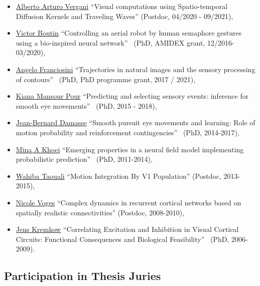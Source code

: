\documentclass[10pt,english,a4paper,oneside]{article}%
\begin{document}
\begin{itemize}
	\item \href{https://laurentperrinet.github.io/author/alberto-arturo-vergani/}{Alberto Arturo Vergani} 	``Visual computations using Spatio-temporal Diffusion Kernels and Traveling Waves'' (Postdoc, 04/2020 - 09/2021),
	\item \href{https://laurentperrinet.github.io/author/victor-boutin/}{Victor Boutin} 	``Controlling an aerial robot by human semaphore gestures using a bio-inspired neural network''~\textcite{Boutin20thesis} (PhD, AMIDEX grant, 12/2016-03/2020),
	\item \href{https://laurentperrinet.github.io/author/angelo-franciosini/}{Angelo Franciosini} ``Trajectories in natural images and the sensory processing of contours''~\textcite{Franciosini21thesis} (PhD, PhD programme grant, 2017 / 2021),
	\item \href{https://laurentperrinet.github.io/author/kiana-mansour-pour/}{Kiana Mansour Pour} 	``Predicting and selecting sensory events: inference for smooth eye movements''~\citep{MansourPour19thesis} (PhD, 2015 - 2018),
	\item \href{https://laurentperrinet.github.io/author/jean-bernard-damasse/}{Jean-Bernard Damasse} 	``Smooth pursuit eye movements and learning: Role of motion probability and reinforcement contingencies''~\citep{Damasse18thesis} (PhD, 2014-2017),
	\item \href{https://laurentperrinet.github.io/author/mina-a-khoei/}{Mina A Khoei} 	``Emerging properties in a neural field model implementing probabilistic prediction''~\textcite{Khoei14thesis} (PhD, 2011-2014),
	\item \href{https://laurentperrinet.github.io/author/wahiba-taouali/}{Wahiba Taouali} 	``Motion Integration By V1 Population'' (Postdoc, 2013-2015),
	\item \href{https://laurentperrinet.github.io/author/nicole-voges/}{Nicole Voges} 	``Complex dynamics in recurrent cortical networks based on spatially realistic connectivities'' (Postdoc, 2008-2010),
	\item \href{https://laurentperrinet.github.io/author/jens-kremkow/}{Jens Kremkow} ``Correlating Excitation and Inhibition in Visual Cortical Circuits: Functional Consequences and Biological Feasibility''~\citep{Kremkow09thesis} (PhD, 2006-2009).
\end{itemize}

\subsection{Participation in Thesis Juries} %
\end{document}
